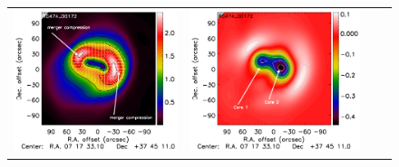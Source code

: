 \documentclass[traditabstract]{aa}
\begin{document}
\begin{figure}[h]
{\begin{tabular}{llll}
\includegraphics[trim=2.3cm 2.2cm 0cm 0cm, clip=true, scale=1]{Figure/Grad_RG474_00172_Ymap_zobs0p9_regrid_15_15_45.pdf} & 
\includegraphics[trim=2.3cm 2.2cm 0cm 0cm, clip=true, scale=1]{Figure/DoG_RG474_00172_Ymap_zobs0p9_regrid_15_15_45.pdf} \\

\end{tabular}}
\end{figure}
\end{document}
